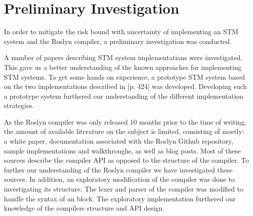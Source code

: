 \makeatletter {}\makeatother
{}
\label{chap:evaluation}

\section{Preliminary Investigation}
In order to mitigate the risk bound with uncertainty of implementing an \ac{STM} system and the Roslyn compiler, a preliminary investigation was conducted. 

A number of papers describing \ac{STM} system implementations were investigated. This gave us a better understanding of the known approaches for implementing \ac{STM} systems. To get some hands on experience, a prototype \ac{STM} system based on the two implementations described in \cite{herlihy2012art}[p. 424] was developed. Developing such a prototype system furthered our understanding of the different implementation strategies.

As the Roslyn compiler was only released 10 months prior to the time of writing, the amount of available literature on the subject is limited, consisting of mostly: a white paper\cite{ng2012roslyn}, documentation associated with the Roslyn Github repository\cite{roslynwiki}, sample implementations and walkthroughs\cite{roslynsamples}, as well as blog posts. Most of these sources describe the compiler \ac{API} as opposed to the structure of the compiler. To further our understanding of the Roslyn compiler we have investigated these sources. In addition, an exploratory modification of the compiler was done to investigating its structure. The lexer and parser of the compiler was modified to handle the syntax of an  block. The exploratory implementation furthered our knowledge of the compilers structure and \ac{API} design.
\worksheetend
